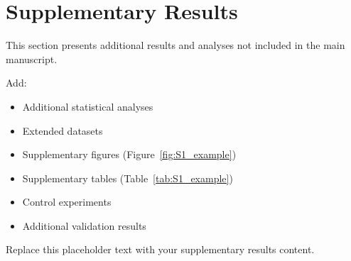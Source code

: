 
\section*{Supplementary Results}

This section presents additional results and analyses not included in the main manuscript.

Add:
\begin{itemize}
    \item Additional statistical analyses
    \item Extended datasets
    \item Supplementary figures (Figure~\ref{fig:S1_example})
    \item Supplementary tables (Table~\ref{tab:S1_example})
    \item Control experiments
    \item Additional validation results
\end{itemize}

Replace this placeholder text with your supplementary results content.
